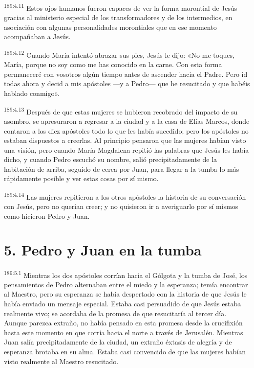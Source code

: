 \par 
\textsuperscript{189:4.11} Estos ojos humanos fueron capaces de ver la forma morontial de Jesús gracias al ministerio especial de los transformadores y de los intermedios, en asociación con algunas personalidades morontiales que en ese momento acompañaban a Jesús.

\par 
\textsuperscript{189:4.12} Cuando María intentó abrazar sus pies, Jesús le dijo: «No me toques, María, porque no soy como me has conocido en la carne. Con esta forma permaneceré con vosotros algún tiempo antes de ascender hacia el Padre. Pero id todas ahora y decid a mis apóstoles ---y a Pedro--- que he resucitado y que habéis hablado conmigo».

\par 
\textsuperscript{189:4.13} Después de que estas mujeres se hubieron recobrado del impacto de su asombro, se apresuraron a regresar a la ciudad y a la casa de Elías Marcos, donde contaron a los diez apóstoles todo lo que les había sucedido; pero los apóstoles no estaban dispuestos a creerlas. Al principio pensaron que las mujeres habían visto una visión, pero cuando María Magdalena repitió las palabras que Jesús les había dicho, y cuando Pedro escuchó su nombre, salió precipitadamente de la habitación de arriba, seguido de cerca por Juan, para llegar a la tumba lo más rápidamente posible y ver estas cosas por sí mismo.

\par 
\textsuperscript{189:4.14} Las mujeres repitieron a los otros apóstoles la historia de su conversación con Jesús, pero no querían creer; y no quisieron ir a averiguarlo por sí mismos como hicieron Pedro y Juan.

\section*{5. Pedro y Juan en la tumba}
\par 
\textsuperscript{189:5.1} Mientras los dos apóstoles corrían hacia el Gólgota y la tumba de José, los pensamientos de Pedro alternaban entre el miedo y la esperanza; temía encontrar al Maestro, pero su esperanza se había despertado con la historia de que Jesús le había enviado un mensaje especial. Estaba casi persuadido de que Jesús estaba realmente vivo; se acordaba de la promesa de que resucitaría al tercer día. Aunque parezca extraño, no había pensado en esta promesa desde la crucifixión hasta este momento en que corría hacia el norte a través de Jerusalén. Mientras Juan salía precipitadamente de la ciudad, un extraño éxtasis de alegría y de esperanza brotaba en su alma. Estaba casi convencido de que las mujeres habían visto realmente al Maestro resucitado.


